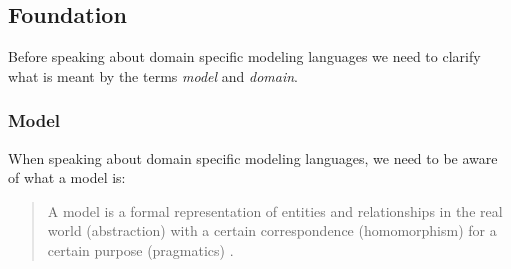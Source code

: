 \documentclass[runningheads,a4paper]{llncs}
\begin{document}

\subsection{Foundation}
\label{subsec:introduction}
Before speaking about domain specific modeling languages we need to clarify what is meant by the 
terms \emph{model} and \emph{domain}.

\subsubsection{Model}
% 
%  
%  
  When speaking about domain specific modeling languages, we need to be aware of what a model is:
  
  \begin{quote}
   A model is a formal representation of entities and relationships in the real world (abstraction) 
  with a certain correspondence (homomorphism) for a certain purpose (pragmatics) \cite{stachowiak1973allgemeine}.
  \end{quote}
  
\end{document}
